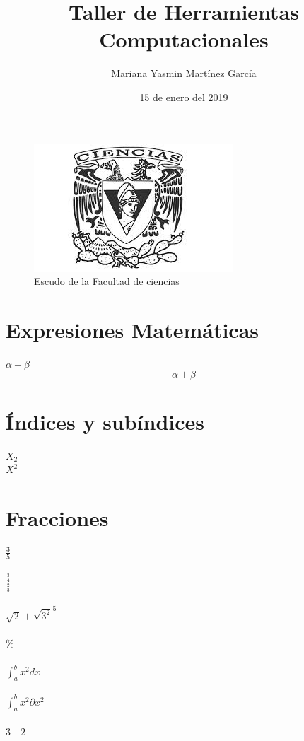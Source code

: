 \documentclass{article}
\title{\Huge Taller de Herramientas Computacionales}
\author{Mariana Yasmin Martínez García}
\date{15 de enero del 2019}
\begin{document}
	\maketitle
	\begin{figure}
		\includegraphics[scale=.5]{Imagenes/1}
		\caption{Escudo de la Facultad de ciencias}
		\label{fig:1}
	\end{figure}

\newpage
\section*{Expresiones Matemáticas}
$ \alpha + \beta $ \\  %
\[ \alpha + \beta \] %

\section*{Índices y subíndices}
$X_{2}$ \\
$X^{2}$  \\

\section*{Fracciones}
$\frac{3}{5}$\\ \\
$\frac{\frac{3}{4}}{\frac{2}{3}}$ \\ \\

$\sqrt{2} + \sqrt{3^2}^5$ \\ \\
\% \\ \\%
$\int_{a}^{b} x^2 dx$ \\ \\
$\int_{a}^{b} x^2 \partial x^2$ \\ \\
$3 \quad 2$
\end{document}
